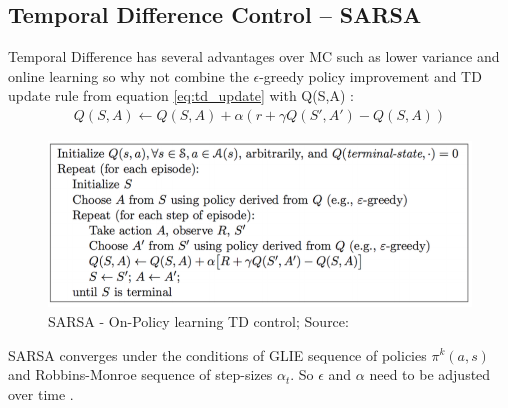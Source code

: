 

\subsection{Temporal Difference Control -- SARSA}
Temporal Difference has several advantages over MC such as lower variance and online learning so why not combine the $\epsilon$-greedy policy improvement and TD update rule from equation \ref{eq:td_update} with Q(S,A) \cite{lecture_mfc} :
\begin{align}
    Q(S, A) \longleftarrow Q(S, A) + \alpha (r + \gamma Q(S', A') - Q(S, A)) \label{eq:sarsa_update_rule}
\end{align}

\begin{figure}[h!]
  \centering
  \includegraphics[scale=0.5]{figures/sarsa.PNG}
  \caption{SARSA - On-Policy learning TD control; Source: \cite{lecture_mfc}}
  \label{fig:sarsa}
\end{figure}

SARSA converges under the conditions of GLIE sequence of policies $\pi^k(a, s)$ and Robbins-Monroe sequence of step-sizes $\alpha_t$. So $\epsilon$ and $\alpha$ need to be adjusted over time \cite{lecture_mfc}.

